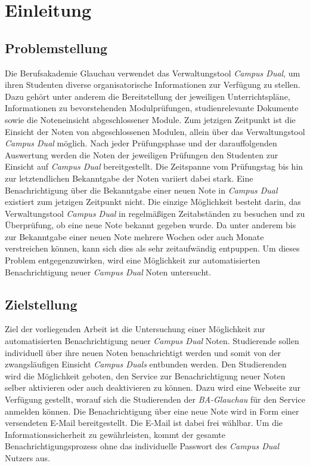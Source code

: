 \chapter{Einleitung}

\section{Problemstellung}
Die Berufsakademie Glauchau verwendet das Verwaltungstool \textit{Campus Dual}, um ihren Studenten diverse organisatorische Informationen zur Verfügung zu stellen.
Dazu gehört unter anderem die Bereitstellung der jeweiligen Unterrichtspläne, Informationen zu bevorstehenden Modulprüfungen, studienrelevante Dokumente sowie die Noteneinsicht abgeschlossener Module.
Zum jetzigen Zeitpunkt ist die Einsicht der Noten von abgeschlossenen Modulen, allein über das Verwaltungstool \textit{Campus Dual} möglich.
Nach jeder Prüfungsphase und der darauffolgenden Auswertung werden die Noten der jeweiligen Prüfungen den Studenten zur Einsicht auf \textit{Campus Dual} bereitgestellt.
Die Zeitspanne vom Prüfungstag bis hin zur letztendlichen Bekanntgabe der Noten variiert dabei stark.
Eine Benachrichtigung über die Bekanntgabe einer neuen Note in \textit{Campus Dual} existiert zum jetzigen Zeitpunkt nicht.
Die einzige Möglichkeit besteht darin, das Verwaltungstool \textit{Campus Dual} in regelmäßigen Zeitabständen zu besuchen und zu Überprüfung, ob eine neue Note bekannt gegeben wurde.
Da unter anderem bis zur Bekanntgabe einer neuen Note mehrere Wochen oder auch Monate verstreichen können, kann sich dies als sehr zeitaufwändig entpuppen.
Um dieses Problem entgegenzuwirken, wird eine Möglichkeit zur automatisierten Benachrichtigung neuer \textit{Campus Dual} Noten untersucht.


\section{Zielstellung}
Ziel der vorliegenden Arbeit ist die Untersuchung einer Möglichkeit zur automatisierten Benachrichtigung neuer \textit{Campus Dual} Noten.
Studierende sollen individuell über ihre neuen Noten benachrichtigt werden und somit von der zwangsläufigen Einsicht \textit{Campus Duals} entbunden werden.
Den Studierenden wird die Möglichkeit geboten, den Service zur Benachrichtigung neuer Noten selber aktivieren oder auch deaktivieren zu können.
Dazu wird eine Webseite zur Verfügung gestellt, worauf sich die Studierenden der \textit{BA-Glauchau} für den Service anmelden können.
Die Benachrichtigung über eine neue Note wird in Form einer versendeten E-Mail bereitgestellt.
Die E-Mail ist dabei frei wählbar.
Um die Informationssicherheit zu gewährleisten, kommt der gesamte Benachrichtigungsprozess ohne das individuelle Passwort des \textit{Campus Dual} Nutzers aus.






 

